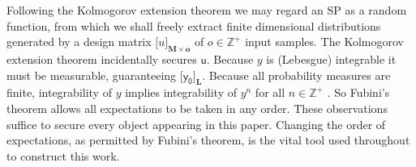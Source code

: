 \documentclass[preprint,12pt]{elsarticle}
\newcommand*{\x}{\times}
\newcommand*{\mi}[1]{\mathbf{#1}}
\newcommand*{\st}[1]{\mathbb{#1}}
\newcommand*{\rv}[1]{\mathsf{#1}}
\newcommand*{\tte}[2][]{\lbrack{#2}\rbrack_{#1}}
\begin{document}
    Following the Kolmogorov extension theorem \cite[pp.124]{Rogers.Williams2000} we may regard an SP as a random function, from which we shall freely extract finite dimensional distributions generated by a design matrix $\tte[\mi{M\x o}]{u}$ of $o \in \st{Z}^{+}$ input samples.
    The Kolmogorov extension theorem incidentally secures $\rv{u}$. 
    Because $y$ is (Lebesgue) integrable it must be measurable, guaranteeing $\tte[\mi{L}]{\rv{y_0}}$.
    Because all probability measures are finite, integrability of $y$ implies integrability of $y^n$ for all $n \in \st{Z}^{+}$ \cite{Villani1985}. 
    So Fubini's theorem \cite[pp.77]{Williams1991} allows all expectations to be taken in any order. These observations suffice to secure every object appearing in this paper. Changing the order of expectations, as permitted by Fubini's theorem, is the vital tool used throughout to construct this work. 
\end{document}
